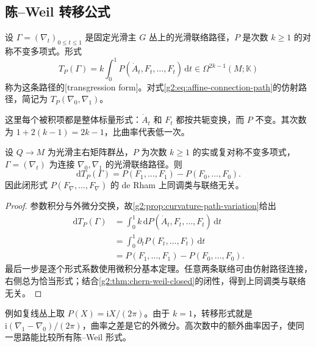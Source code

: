 \subsection{陈–Weil 转移公式}
\label{g2:subsec:2202:02}
\begin{definition}\label{g2:def:chern-weil-transgression}
	设 \(\Gamma=(\nabla_t)_{0\le t\le1}\) 是固定光滑主 \(G\) 丛上的光滑联络路径，\(P\) 是次数 \(k\ge1\) 的对称不变多项式。形式
	\begin{equation}\label{g2:eq:chern-weil-transgression}
		T_P(\Gamma)=k\int_0^1P(\dot A_t,F_t,\ldots,F_t)\,\mathrm dt
		\in\Omega^{2k-1}(M;\mathbb K)
	\end{equation}
	称为这条路径的[transgression form]。对式\eqref{g2:eq:affine-connection-path}的仿射路径，简记为 \(T_P(\nabla_0,\nabla_1)\)。
\end{definition}

这里每个被积项都是整体标量形式：\(\dot A_t\) 和 \(F_t\) 都按共轭变换，而 \(P\) 不变。其次数为 \(1+2(k-1)=2k-1\)，比曲率代表低一次。

\begin{theorem}\label{g2:thm:chern-weil-transgression}
	设 \(Q\to M\) 为光滑主右矩阵群丛，\(P\) 为次数 \(k\ge1\) 的实或复对称不变多项式，\(\Gamma=(\nabla_t)\) 为连接 \(\nabla_0,\nabla_1\) 的光滑联络路径。则
	\begin{equation}\label{g2:eq:chern-weil-transgression-differential}
		\mathrm dT_P(\Gamma)=P(F_1,\ldots,F_1)-P(F_0,\ldots,F_0).
	\end{equation}
	因此闭形式 \(P(F_\nabla,\ldots,F_\nabla)\) 的 de Rham 上同调类与联络无关。
\end{theorem}
\begin{proof}
	参数积分与外微分交换，故\cref{g2:prop:curvature-path-variation}给出
	\[
	\begin{aligned}
		\mathrm dT_P(\Gamma)
		&=\int_0^1 k\,\mathrm dP(\dot A_t,F_t,\ldots,F_t)\,\mathrm dt\\
		&=\int_0^1\partial_tP(F_t,\ldots,F_t)\,\mathrm dt\\
		&=P(F_1,\ldots,F_1)-P(F_0,\ldots,F_0).
	\end{aligned}
	\]
	最后一步是逐个形式系数使用微积分基本定理。任意两条联络可由仿射路径连接，右侧总为恰当形式；结合\cref{g2:thm:chern-weil-closed}的闭性，得到上同调类与联络无关。
\end{proof}

例如复线丛上取 \(P(X)=\mathrm iX/(2\pi)\)。由于 \(k=1\)，转移形式就是 \(\mathrm i(\nabla_1-\nabla_0)/(2\pi)\)，曲率之差是它的外微分。高次数中的额外曲率因子，使同一思路能比较所有陈--Weil 形式。

